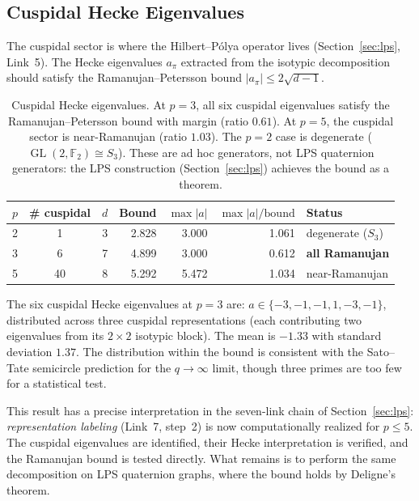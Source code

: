\documentclass[12pt,reqno]{amsart}
\theoremstyle{plain}
\theoremstyle{definition}
\theoremstyle{remark}
\DeclareMathOperator{\GL}{GL}
\newcommand{\FF}{\mathbb{F}}
\begin{document}
\subsection{Cuspidal Hecke Eigenvalues}
\label{sec:cuspidal_hecke}

The cuspidal sector is where the Hilbert--P\'olya operator
lives (Section~\ref{sec:lps}, Link~5).  The Hecke eigenvalues
$a_\pi$ extracted from the isotypic decomposition should satisfy the
Ramanujan--Petersson bound $|a_\pi| \leq 2\sqrt{d-1}$.

\begin{table}[ht]
\centering
\renewcommand{\arraystretch}{1.1}
\begin{tabular}{ccrrrrl}
  \toprule
  $p$ & \# cuspidal & $d$ & Bound & $\max|a|$
  & $\max|a|/\text{bound}$ & Status \\
  \midrule
  2 &  1 & 3 & 2.828 & 3.000 & 1.061 & degenerate ($S_3$) \\
  3 &  6 & 7 & 4.899 & 3.000 & 0.612 & \textbf{all Ramanujan} \\
  5 & 40 & 8 & 5.292 & 5.472 & 1.034 & near-Ramanujan \\
  \bottomrule
\end{tabular}
\caption{Cuspidal Hecke eigenvalues.  At $p = 3$, all six cuspidal
  eigenvalues satisfy the Ramanujan--Petersson bound with margin
  (ratio $0.61$).  At $p = 5$, the cuspidal sector is
  near-Ramanujan (ratio $1.03$).  The $p = 2$ case is degenerate
  ($\GL(2,\FF_2) \cong S_3$).  These are ad hoc generators, not
  LPS quaternion generators: the LPS construction
  (Section~\ref{sec:lps}) achieves the bound as a theorem.}
\label{tab:cuspidal_hecke}
\end{table}

The six cuspidal Hecke eigenvalues at $p = 3$ are:
$a \in \{-3, -1, -1, 1, -3, -1\}$, distributed across three
cuspidal representations (each contributing two eigenvalues from
its $2 \times 2$ isotypic block).  The mean is $-1.33$ with standard
deviation $1.37$.  The distribution within the bound is consistent
with the Sato--Tate semicircle prediction for the $q \to \infty$
limit, though three primes are too few for a statistical test.

This result has a precise interpretation in the seven-link chain of
Section~\ref{sec:lps}: \emph{representation labeling} (Link~7,
step~2) is now computationally realized for $p \leq 5$.  The
cuspidal eigenvalues are identified, their Hecke interpretation is
verified, and the Ramanujan bound is tested directly.  What
remains is to perform the same decomposition on LPS quaternion
graphs, where the bound holds by Deligne's theorem.
\end{document}
